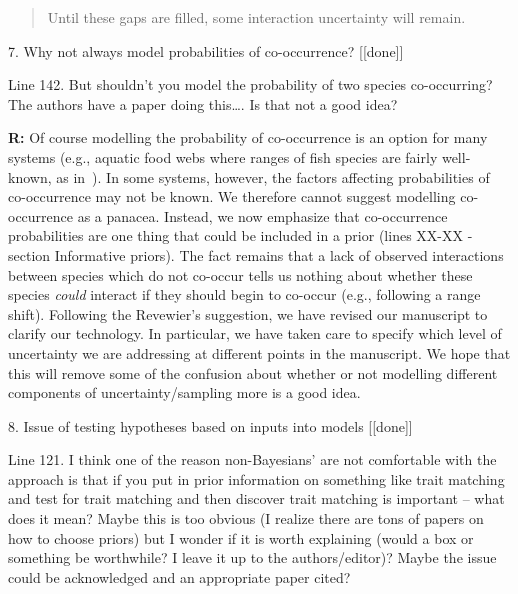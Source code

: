\documentclass[12pt]{letter}
\newenvironment{refquote}{\bigskip \begin{it}}{\end{it}\smallskip}
\begin{document}
			\begin{quotation}

				Until these gaps are filled, some interaction uncertainty will remain.

			\end{quotation}


	7. Why not always model probabilities of co-occurrence? [[done]]

		\begin{refquote}
		Line 142.  But shouldn’t you model the probability of two species co-occurring?  The authors have a paper doing this…. Is that not a good idea?
		\end{refquote}

		\textbf{R:} Of course modelling the probability of co-occurrence is an option for many systems (e.g., aquatic food webs where ranges of fish species are fairly well-known, as in~\citet{Gravel2013}). In some systems, however, the factors affecting probabilities of co-occurrence may not be known. We therefore cannot suggest modelling co-occurrence as a panacea. Instead, we now emphasize that co-occurrence probabilities are one thing that could be included in a prior (lines XX-XX - section Informative priors). 
		\smallskip
		The fact remains that a lack of observed interactions between species which do not co-occur tells us nothing about whether these species \emph{could} interact if they should begin to co-occur (e.g., following a range shift). Following the Revewier's suggestion, we have revised our manuscript to clarify our technology. In particular, we have taken care to specify which level of uncertainty we are addressing at different points in the manuscript. We hope that this will remove some of the confusion about whether or not modelling different components of uncertainty/sampling more is a good idea. 


	8. Issue of testing hypotheses based on inputs into models [[done]]

		\begin{refquote}
		Line 121.  I think one of the reason non-Bayesians’ are not comfortable with the approach is that if you put in prior information on something like trait matching and test for trait matching and then discover trait matching is important – what does it mean?  Maybe this is too obvious (I realize there are tons of papers on how to choose priors) but I wonder if it is worth explaining (would a box or something be worthwhile?  I leave it up to the authors/editor)?  Maybe the issue could be acknowledged and an appropriate paper cited?
		\end{refquote}
\end{document}
